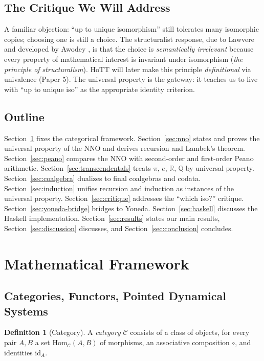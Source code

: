 \documentclass[12pt]{article}
\theoremstyle{definition}
\newtheorem{definition}[theorem]{Definition}
\theoremstyle{remark}
\newcommand{\Q}{\mathbb{Q}}
\newcommand{\R}{\mathbb{R}}
\newcommand{\id}{\mathrm{id}}
\newcommand{\Hom}{\mathrm{Hom}}
\begin{document}
\subsection{The Critique We Will Address}

A familiar objection: ``up to unique isomorphism'' still tolerates many isomorphic copies; choosing one is still a choice. The structuralist response, due to Lawvere and developed by Awodey \cite{Awodey1996,Awodey2014}, is that the choice is \emph{semantically irrelevant} because every property of mathematical interest is invariant under isomorphism (\emph{the principle of structuralism}). HoTT will later make this principle \emph{definitional} via univalence (Paper 5). The universal property is the gateway: it teaches us to live with ``up to unique iso'' as the appropriate identity criterion.

\subsection{Outline}

Section~\ref{sec:framework} fixes the categorical framework. Section~\ref{sec:nno} states and proves the universal property of the NNO and derives recursion and Lambek's theorem. Section~\ref{sec:peano} compares the NNO with second-order and first-order Peano arithmetic. Section~\ref{sec:transcendentals} treats $\pi$, $e$, $\R$, $\Q$ by universal property. Section~\ref{sec:coalgebra} dualizes to final coalgebras and codata. Section~\ref{sec:induction} unifies recursion and induction as instances of the universal property. Section~\ref{sec:critique} addresses the ``which iso?'' critique. Section~\ref{sec:yoneda-bridge} bridges to Yoneda. Section~\ref{sec:haskell} discusses the Haskell implementation. Section~\ref{sec:results} states our main results, Section~\ref{sec:discussion} discusses, and Section~\ref{sec:conclusion} concludes.

\section{Mathematical Framework}
\label{sec:framework}

\subsection{Categories, Functors, Pointed Dynamical Systems}

\begin{definition}[Category]
A \emph{category} $\mathcal{C}$ consists of a class of objects, for every pair $A, B$ a set $\Hom_{\mathcal{C}}(A,B)$ of morphisms, an associative composition $\circ$, and identities $\id_A$.
\end{definition}
\end{document}
